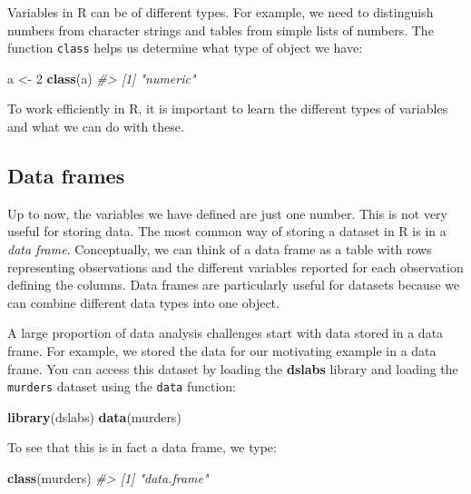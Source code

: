 \documentclass[
]{krantz}
\newenvironment{Shaded}{\begin{snugshade}}{\end{snugshade}}
\newcommand{\CommentTok}[1]{\textcolor[rgb]{0.37,0.37,0.37}{\textit{#1}}}
\newcommand{\DecValTok}[1]{\textcolor[rgb]{0.06,0.06,0.06}{#1}}
\newcommand{\KeywordTok}[1]{\textcolor[rgb]{0.27,0.27,0.27}{\textbf{#1}}}
\newcommand{\NormalTok}[1]{#1}
\newcommand{\StringTok}[1]{\textcolor[rgb]{0.5,0.5,0.5}{#1}}
\begin{document}
Variables in R can be of different types. For example, we need to distinguish numbers from character strings and tables from simple lists of numbers. The function \texttt{class} helps us determine what type of object we have:

\begin{Shaded}
\begin{Highlighting}[]
\NormalTok{a <-}\StringTok{ }\DecValTok{2}
\KeywordTok{class}\NormalTok{(a)}
\CommentTok{#> [1] "numeric"}
\end{Highlighting}
\end{Shaded}

To work efficiently in R, it is important to learn the different types of variables and what we can do with these.

\hypertarget{data-frames}{%
\subsection{Data frames}\label{data-frames}}

Up to now, the variables we have defined are just one number. This is not very useful for storing data. The most common way of storing a dataset in R is in a \emph{data frame}. Conceptually, we can think of a data frame as a table with rows representing observations and the different variables reported for each observation defining the columns. Data frames are particularly useful for datasets because we can combine different data types into one object.

A large proportion of data analysis challenges start with data stored in a data frame. For example, we stored the data for our motivating example in a data frame. You can access this dataset by loading the \textbf{dslabs} library and loading the \texttt{murders} dataset using the \texttt{data} function:

\begin{Shaded}
\begin{Highlighting}[]
\KeywordTok{library}\NormalTok{(dslabs)}
\KeywordTok{data}\NormalTok{(murders)}
\end{Highlighting}
\end{Shaded}

To see that this is in fact a data frame, we type:

\begin{Shaded}
\begin{Highlighting}[]
\KeywordTok{class}\NormalTok{(murders)}
\CommentTok{#> [1] "data.frame"}
\end{Highlighting}
\end{Shaded}
\end{document}
